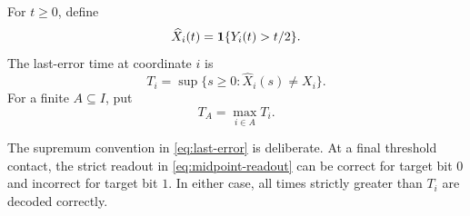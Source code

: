 \begin{definition}\label{def:last-error}
For $t\ge0$, define
\begin{equation}\label{eq:midpoint-readout}
  \widehat X_i(t)=\mathbf{1}\{Y_i(t)>t/2\}.
\end{equation}
The last-error time at coordinate $i$ is
\begin{equation}\label{eq:last-error}
  T_i=\sup\{s\ge0:\widehat X_i(s)\ne X_i\}.
\end{equation}
For a finite $A\subseteq I$, put
\begin{equation}\label{eq:finite-stabilization}
  T_A=\max_{i\in A}T_i.
\end{equation}
\end{definition}

The supremum convention in \eqref{eq:last-error} is deliberate.  At a final
threshold contact, the strict readout in \eqref{eq:midpoint-readout} can be
correct for target bit $0$ and incorrect for target bit $1$.  In either case,
all times strictly greater than $T_i$ are decoded correctly.
